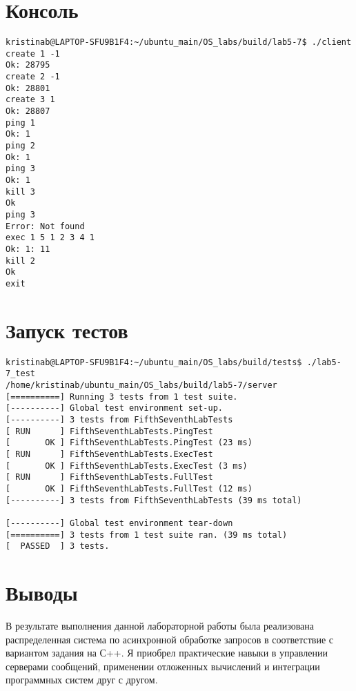 \documentclass[a4paper, 12pt]{article}
\begin{document}
\newpage

\section{Консоль}
\begin{verbatim}
kristinab@LAPTOP-SFU9B1F4:~/ubuntu_main/OS_labs/build/lab5-7$ ./client
create 1 -1
Ok: 28795
create 2 -1
Ok: 28801
create 3 1
Ok: 28807
ping 1
Ok: 1
ping 2
Ok: 1
ping 3
Ok: 1
kill 3
Ok
ping 3
Error: Not found
exec 1 5 1 2 3 4 1
Ok: 1: 11
kill 2
Ok
exit
\end{verbatim}

\section{Запуск тестов}
\begin{verbatim}
kristinab@LAPTOP-SFU9B1F4:~/ubuntu_main/OS_labs/build/tests$ ./lab5-7_test
/home/kristinab/ubuntu_main/OS_labs/build/lab5-7/server
[==========] Running 3 tests from 1 test suite.
[----------] Global test environment set-up.
[----------] 3 tests from FifthSeventhLabTests
[ RUN      ] FifthSeventhLabTests.PingTest
[       OK ] FifthSeventhLabTests.PingTest (23 ms)
[ RUN      ] FifthSeventhLabTests.ExecTest
[       OK ] FifthSeventhLabTests.ExecTest (3 ms)
[ RUN      ] FifthSeventhLabTests.FullTest
[       OK ] FifthSeventhLabTests.FullTest (12 ms)
[----------] 3 tests from FifthSeventhLabTests (39 ms total)

[----------] Global test environment tear-down
[==========] 3 tests from 1 test suite ran. (39 ms total)
[  PASSED  ] 3 tests.
\end{verbatim}
\newpage

\section{Выводы}

В результате выполнения данной лабораторной работы была реализована распределенная система по асинхронной обработке запросов в соответствие с вариантом задания на С++. Я приобрел практические навыки в управлении серверами сообщений, применении отложенных вычислений и интеграции программных систем друг с другом.
\end{document}
